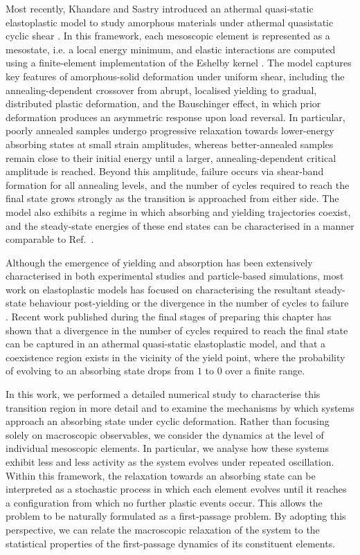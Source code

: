 Most recently, Khandare and Sastry introduced an athermal quasi-static elastoplastic model to study amorphous materials under athermal quasistatic cyclic shear \cite{khandareElastoplasticModellingCyclic2026}. In this framework, each mesoscopic element is represented as a mesostate, i.e. a local energy minimum, and elastic interactions are computed using a finite-element implementation of the Eshelby kernel \cite{Nicolas2015,Budrikis2017}. The model captures key features of amorphous-solid deformation under uniform shear, including the annealing-dependent crossover from abrupt, localised yielding to gradual, distributed plastic deformation, and the Bauschinger effect, in which prior deformation produces an asymmetric response upon load reversal. In particular, poorly annealed samples undergo progressive relaxation towards lower-energy absorbing states at small strain amplitudes, whereas better-annealed samples remain close to their initial energy until a larger, annealing-dependent critical amplitude is reached. Beyond this amplitude, failure occurs via shear-band formation for all annealing levels, and the number of cycles required to reach the final state grows strongly as the transition is approached from either side. The model also exhibits a regime in which absorbing and yielding trajectories coexist, and the steady-state energies of these end states can be characterised in a manner comparable to Ref.~\cite{liuFateShearoscillatedAmorphous2022}.

Although the emergence of yielding and absorption has been extensively characterised in both experimental studies and particle-based simulations, most work on elastoplastic models has focused on characterising the resultant steady-state behaviour post-yielding \cite{liuFateShearoscillatedAmorphous2022} or the divergence in the number of cycles to failure \cite{cochran_slow_2024}. Recent work published \cite{khandareElastoplasticModellingCyclic2026} during the final stages of preparing this chapter has shown that a divergence in the number of cycles required to reach the final state can be captured in an athermal quasi-static elastoplastic model, and that a coexistence region exists in the vicinity of the yield point, where the probability of evolving to an absorbing state drops from $1$ to $0$ over a finite range. 

In this work, we performed a detailed numerical study to characterise this transition region in more detail and to examine the mechanisms by which systems approach an absorbing state under cyclic deformation. Rather than focusing solely on macroscopic observables, we consider the dynamics at the level of individual mesoscopic elements. In particular, we analyse how these systems exhibit less and less activity as the system evolves under repeated oscillation. Within this framework, the relaxation towards an absorbing state can be interpreted as a stochastic process in which each element evolves until it reaches a configuration from which no further plastic events occur.  This allows the problem to be naturally formulated as a first-passage problem. By adopting this perspective, we can relate the macroscopic relaxation of the system to the statistical properties of the first-passage dynamics of its constituent elements.

